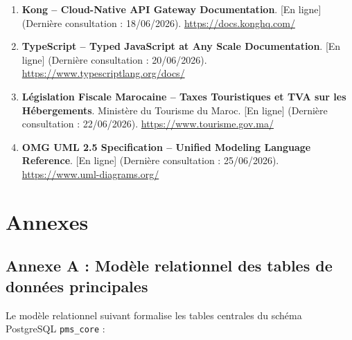\documentclass[12pt,a4paper,oneside]{report}
\begin{document}
\begin{enumerate}
    \item \textbf{Kong -- Cloud-Native API Gateway Documentation}. [En ligne] (Dernière consultation : 18/06/2026). \url{https://docs.konghq.com/}
    \item \textbf{TypeScript -- Typed JavaScript at Any Scale Documentation}. [En ligne] (Dernière consultation : 20/06/2026). \url{https://www.typescriptlang.org/docs/}
    \item \textbf{Législation Fiscale Marocaine -- Taxes Touristiques et TVA sur les Hébergements}. Ministère du Tourisme du Maroc. [En ligne] (Dernière consultation : 22/06/2026). \url{https://www.tourisme.gov.ma/}
    \item \textbf{OMG UML 2.5 Specification -- Unified Modeling Language Reference}. [En ligne] (Dernière consultation : 25/06/2026). \url{https://www.uml-diagrams.org/}
\end{enumerate}

\clearpage

\chapter*{Annexes}

\section*{Annexe A : Modèle relationnel des tables de données principales}

Le modèle relationnel suivant formalise les tables centrales du schéma PostgreSQL \texttt{pms\_core} :
\end{document}
